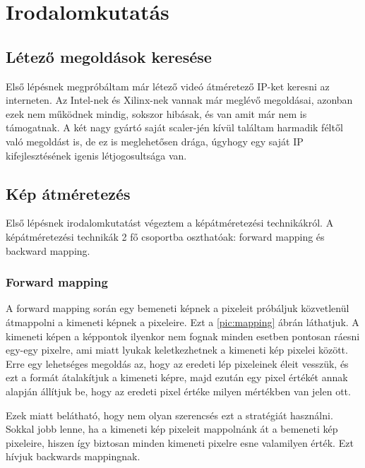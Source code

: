 \chapter{Irodalomkutatás}
\label{sec:LatexTools}
\section{Létező megoldások keresése}

Első lépésnek megpróbáltam már létező videó átméretező IP-ket keresni az interneten. Az Intel\cite{intelscaler}-nek és Xilinx\cite{xilinxscaler}-nek vannak már meglévő megoldásai, azonban ezek nem működnek mindig, sokszor hibásak, és van amit már nem is támogatnak. A két nagy gyártó saját scaler-jén kívül találtam harmadik féltől való megoldást is\cite{zipcores}, de ez is meglehetősen drága, úgyhogy egy saját IP kifejlesztésének igenis létjogosultsága van.

\section{Kép átméretezés}

Első lépésnek irodalomkutatást végeztem a képátméretezési technikákról. A képátméretezési technikák 2 fő csoportba oszthatóak: forward mapping és backward mapping.

\subsection{Forward mapping}

A forward mapping során egy bemeneti képnek a pixeleit próbáljuk közvetlenül átmappolni a kimeneti képnek a pixeleire. Ezt a \ref{pic:mapping} ábrán láthatjuk.  A kimeneti képen a képpontok ilyenkor nem fognak minden esetben pontosan ráesni egy-egy pixelre, ami miatt lyukak keletkezhetnek a kimeneti kép pixelei között. Erre egy lehetséges megoldás az, hogy az eredeti lép pixeleinek éleit vesszük, és ezt a formát átalakítjuk a kimeneti képre, majd ezután egy pixel értékét annak alapján állítjuk be, hogy az eredeti pixel értéke milyen mértékben van jelen ott. \cite{forwardmapping}

Ezek miatt belátható, hogy nem olyan szerencsés ezt a stratégiát használni. Sokkal jobb lenne, ha a kimeneti kép pixeleit mappolnánk át a bemeneti kép pixeleire, hiszen így biztosan minden kimeneti pixelre esne valamilyen érték. Ezt hívjuk backwards mappingnak.

